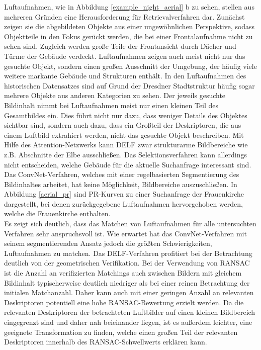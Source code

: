 Luftaufnahmen, wie in Abbildung \ref{example_night_aerial} b zu sehen, stellen aus mehreren Gründen eine Herausforderung für Retrievalverfahren dar. Zunächst zeigen sie die abgebildeten Objekte aus einer ungewöhnlichen Perspektive, sodass Objektteile in den Fokus gerückt werden, die bei einer Frontalaufnahme nicht zu sehen sind. Zugleich werden große Teile der Frontansicht durch Dächer und Türme der Gebäude verdeckt. Luftaufnahmen zeigen auch meist nicht nur das gesuchte Objekt, sondern einen großen Ausschnitt der Umgebung, der häufig viele weitere markante Gebäude und Strukturen enthält. In den Luftaufnahmen des historischen Datensatzes sind auf Grund der Dresdner Stadtstruktur häufig sogar mehrere Objekte aus anderen Kategorien zu sehen. Der jeweils gesuchte Bildinhalt nimmt bei Luftaufnahmen meist nur einen kleinen Teil des Gesamtbildes ein. Dies führt nicht nur dazu, dass weniger Details des Objektes sichtbar sind, sondern auch dazu, dass ein Großteil der Deskriptoren, die aus einem Luftbild extrahiert werden, nicht das gesuchte Objekt beschreiben. Mit Hilfe des Attention-Netzwerks kann DELF zwar strukturarme Bildbereiche wie z.B. Abschnitte der Elbe ausschließen. Das Selektionsverfahren kann allerdings nicht entscheiden, welche Gebäude für die aktuelle Suchanfrage interessant sind. Das ConvNet-Verfahren, welches mit einer regelbasierten Segmentierung des Bildinhaltes arbeitet, hat keine Möglichkeit, Bildbereiche auszuschließen. In Abbildung \ref{aerial_pr} sind PR-Kurven zu einer Suchanfrage der Frauenkirche dargestellt, bei denen zurückgegebene Luftaufnahmen hervorgehoben werden, welche die Frauenkirche enthalten.
\\
Es zeigt sich deutlich, dass das Matchen von Luftaufnahmen für alle untersuchten Verfahren sehr anspruchsvoll ist. Wie erwartet hat das ConvNet-Verfahren mit seinem segmentierenden Ansatz jedoch die größten Schwierigkeiten, Luftaufnahmen zu matchen. Das DELF-Verfahren profitiert bei der Betrachtung deutlich von der geometrischen Verifikation. Bei der Verwendung von RANSAC ist die Anzahl an verifizierten Matchings auch zwischen Bildern mit gleichem Bildinhalt typischerweise deutlich niedriger als bei einer reinen Betrachtung der initialen Matchanzahl. Daher kann auch mit einer geringen Anzahl an relevanten Deskriptoren potentiell eine hohe RANSAC-Bewertung erzielt werden. Da die relevanten Deskriptoren der betrachteten Luftbilder auf einen kleinen Bildbereich eingegrenzt sind und daher nah beieinander liegen, ist es außerdem leichter, eine geeignete Transformation zu finden, welche einen großen Teil der relevanten Deskriptoren innerhalb des RANSAC-Schwellwerts erklären kann. 
